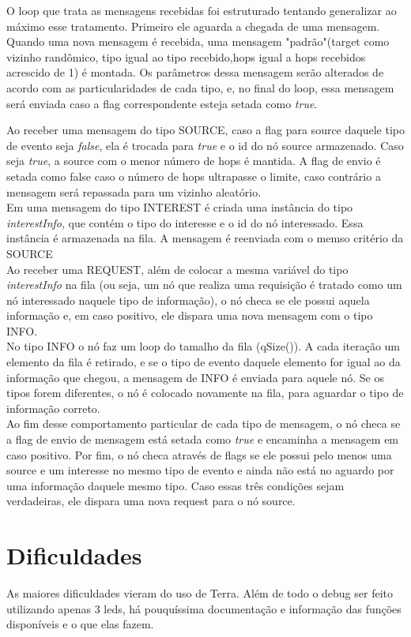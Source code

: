\documentclass{article}
\begin{document}
		O loop que trata as mensagens recebidas foi estruturado tentando generalizar ao máximo esse tratamento. Primeiro ele aguarda a chegada de uma mensagem. Quando uma nova mensagem é recebida, uma mensagem "padrão"(target como vizinho randômico, tipo igual ao tipo recebido,hops igual a hops recebidos acrescido de 1) é montada. Os parâmetros dessa mensagem serão alterados de acordo com as particularidades de cada tipo, e, no final do loop, essa mensagem será enviada caso a flag correspondente esteja setada como \textit{true}.  		
		
		 Ao receber uma mensagem do tipo SOURCE, caso a flag para source daquele tipo de evento seja \textit{false}, ela é trocada para \textit{true} e o id do nó source armazenado. Caso seja \textit{true}, a source com o menor número de hops é mantida. A flag de envio é setada como false caso o número de hops ultrapasse o limite, caso contrário a mensagem será repassada para um vizinho aleatório.\\
		Em uma mensagem do tipo INTEREST é criada uma instância do tipo \textit{interestInfo}, que contém o tipo do interesse e o id do nó interessado. Essa instância é armazenada na fila. A mensagem é reenviada com o memso critério da SOURCE\\
		Ao receber uma REQUEST, além de colocar a mesma variável do tipo \textit{interestInfo} na fila (ou seja, um nó que realiza uma requisição é tratado como um nó interessado naquele tipo de informação), o nó checa se ele possui aquela informação e, em caso positivo, ele dispara uma nova mensagem com o tipo INFO.\\
		No tipo INFO o nó faz um loop do tamalho da fila (qSize()). A cada iteração um elemento da fila é retirado, e se o tipo de evento daquele elemento for igual ao da informação que chegou, a mensagem de INFO é enviada para aquele nó. Se os tipos forem diferentes, o nó é colocado novamente na fila, para aguardar o tipo de informação correto.\\
		
		Ao fim desse comportamento particular de cada tipo de mensagem, o nó checa se a flag de envio de mensagem está setada como \textit{true} e encaminha a mensagem em caso positivo. Por fim, o nó checa através de flags se ele possui pelo menos uma source e um interesse no mesmo tipo de evento e ainda não está no aguardo por uma informação daquele mesmo tipo. Caso essas três condições sejam verdadeiras, ele dispara uma nova request para o nó source.\\
		
		
\section{Dificuldades}

	\tab As maiores dificuldades vieram do uso de Terra. Além de todo o debug ser feito utilizando apenas 3 leds, há pouquíssima documentação e informação das funções disponíveis e o que elas fazem.
		
\end{document}
